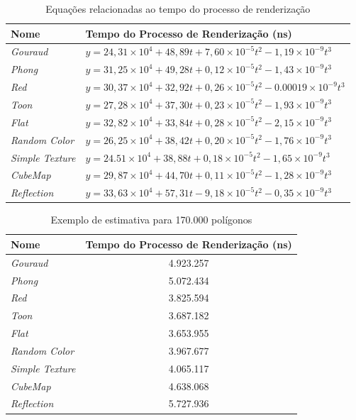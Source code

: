 	\begin{table}[ht]
	\centering	
	\begin{tabularx}{0.9\textwidth}{lX}
		\toprule
		\textbf{Nome} & \textbf{Tempo do Processo de Renderização (ns)}  \\
		\midrule
		\textit{Gouraud} &  $y = 24,31 \times 10^4 + 48,89t + 7,60 \times 10^{-5}t^2 - 1,19 \times 10^{-9}t^3$\\
		\textit{Phong} &   $y = 31,25 \times 10^4 + 49,28t + 0,12 \times 10^{-5}t^2 - 1,43 \times 10^{-9}t^3$\\
		\textit{Red} & $y = 30,37 \times 10^4 + 32,92t + 0,26 \times 10^{-5}t^2 - 0.00019 \times 10^{-9}t^3$\\
		\textit{Toon} & $y = 27,28 \times 10^4 + 37,30t + 0,23 \times 10^{-5}t^2 - 1,93 \times 10^{-9}t^3$\\
		\textit{Flat} & $y = 32,82 \times 10^4 + 33,84t + 0,28 \times 10^{-5}t^2 - 2,15 \times 10^{-9}t^3$\\
		\textit{Random Color} & $y = 26,25 \times 10^4 + 38,42t + 0,20 \times 10^{-5}t^2 - 1,76 \times 10^{-9}t^3$\\
		\textit{Simple Texture} & $y = 24.51 \times 10^4 + 38,88t + 0,18 \times 10^{-5}t^2 - 1,65 \times 10^{-9}t^3$\\
		\textit{CubeMap} & $y = 29,87 \times 10^4 + 44,70t + 0,11 \times 10^{-5}t^2 - 1,28 \times 10^{-9}t^3$\\
		\textit{Reflection} & $y = 33,63 \times 10^4 + 57,31t - 9,18 \times 10^{-5}t^2 - 0,35\times 10^{-9}t^3$ \\
		
		\bottomrule
	\end{tabularx}
	\caption{Equações relacionadas ao tempo do processo de renderização}
	\label{eqrender}
	\end{table}


	\begin{table}[ht]
	\centering	
	\begin{tabularx}{0.9\textwidth}{lc}
		\toprule
		\textbf{Nome} & \textbf{Tempo do Processo de Renderização (ns)}  \\
		\midrule
		\textit{Gouraud} &  4.923.257\\
		\textit{Phong} &   5.072.434\\
		\textit{Red} & 3.825.594\\
		\textit{Toon} & 3.687.182\\
		\textit{Flat} & 3.653.955\\
		\textit{Random Color} & 3.967.677\\
		\textit{Simple Texture} & 4.065.117\\
		\textit{CubeMap} & 4.638.068\\
		\textit{Reflection} & 5.727.936\\
	
	
		\bottomrule
	\end{tabularx}
	\caption{Exemplo de estimativa para 170.000 polígonos}
	\label{estimativa}
	\end{table}


